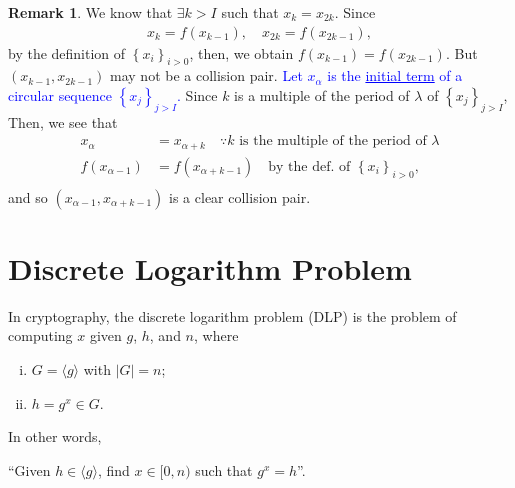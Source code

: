 \documentclass[12pt,openany]{book}
\theoremstyle{definition}
\newtheorem{remark}{Remark}[chapter]
\newcommand{\set}[1]{\left\{#1\right\}}
\newcommand{\abs}[1]{\left\lvert #1 \right\rvert}
\begin{document}
	\begin{remark}
		We know that $\exists k>I$ such that $x_k=x_{2k}$. Since \begin{align*}
			x_k=f(x_{k-1}),\quad x_{2k}=f(x_{2k-1}),
		\end{align*} by the definition of $\set{x_i}_{i>0}$, then, we obtain $f(x_{k-1})=f(x_{2k-1})$. But $(x_{k-1},x_{2k-1})$ may not be a collision pair. \textcolor{blue}{Let $x_\alpha$ is the \underline{initial term} of a circular sequence $\set{x_j}_{j>I}$.} Since $k$ is a multiple of the period of $\lambda$ of $\set{x_j}_{j>I}$, Then, we see that \begin{align*}
			x_\alpha&=x_{\alpha+k}\quad\because\text{$k$ is the multiple of the period of $\lambda$}\\
			f(x_{\alpha-1})&=f(x_{\alpha+k-1})\quad\text{by the def. of $\set{x_i}_{i>0}$},\\
		\end{align*} and so $(x_{\alpha-1},x_{\alpha+k-1})$ is a clear collision pair.
	\end{remark}
	
	\iffalse
	\begin{lstlisting}[style=sage, caption={Small-Sapce Attack (Sage)},captionpos=t]
		N = 2^13 - 1 #12-bit
		n = floor(sqrt(N))
		print("N = {}\nn = floor(sqrt N) = {}\n".format(N,n))
		
		def f(x):
		return (x^2 + 1) % N
		
		# Step 1: Discover k such that x_k = x_{2k}
		x0 = ZZ.random_element(N, 2*N) #x0 is the start node
		x1, x2 = x0, x0
		k = 0
		while True :
		k = k + 1
		x1, x2 = f(x1), f(f(x2))
		if x1 == x2 :
		print ("k = {}, 2k = {}".format(k, 2*k))
		break
		
		# Step 2: Find the collision pair
		x1 , x2 = x0, x2
		for i in [0..k]:
		if f(x1) == f(x2):
		print("Collision: ({}-th elt = {}, {}-th elt = {}) ".format(i, x1, k+i, x2))
		break
		else :
		x1, x2 = f(x1), f(x2)
		
		L = [(0, x0)]
		for j in [1..2*k]:
		L = L + [(j, f(L[j-1][1]))]
		
		# list_plot(L)
		
		for pair in L:
		print(pair)
	\end{lstlisting}
	\fi	
	
	\newpage
	\chapter{Discrete Logarithm Problem}
	In cryptography, the discrete logarithm problem (DLP) is the problem of computing $x$ given $g$, $h$, and $n$, where \begin{enumerate}[(i)]
		\item $G=\langle g\rangle$ with $\abs{G}=n$;
		\item $h=g^x\in G$.
	\end{enumerate} In other words,  \begin{center}
		``Given $h\in\langle g\rangle$, find $x\in[0,n)$ such that $g^x=h$''.
	\end{center}
	
\end{document}
